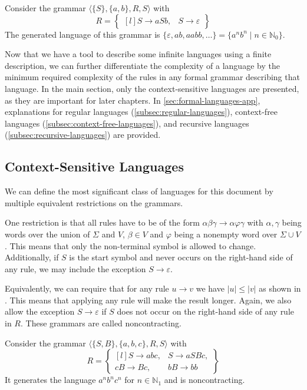 \begin{exmp}
    Consider the grammar $\langle \{S\}, \{a, b\}, R, S \rangle$ with
    \[
        R = \begin{Bmatrix*}[l]
                S \to aSb,
                &S \to \varepsilon
        \end{Bmatrix*}
    \]
    The generated language of this grammar is $\{\varepsilon, ab, aabb, \dots\} = \{a^{n}b^{n} \mid n \in \mathbb{N}_0\}$.
\end{exmp}

Now that we have a tool to describe some infinite languages using a finite description, we can further differentiate the complexity of a language by the minimum required complexity of the rules in any formal grammar describing that language.
In the main section, only the context-sensitive languages are presented, as they are important for later chapters.
In \cref{sec:formal-languages-app}, explanations for regular languages (\cref{subsec:regular-languages}), context-free languages (\cref{subsec:context-free-languages}), and recursive languages (\cref{subsec:recursive-languages}) are provided.

\subsection{Context-Sensitive Languages}\label{subsec:context-sensitive-languages}

We can define the most significant class of languages for this document  by multiple equivalent restrictions on the grammars.

One restriction is that all rules have to be of the form $\alpha\beta\gamma \to \alpha\varphi\gamma$ with $\alpha, \gamma$ being words over the union of $\Sigma$ and $V$, $\beta \in V$ and $\varphi$ being a nonempty word over $\Sigma \cup V$.
This means that only the non-terminal symbol is allowed to change.
Additionally, if $S$ is the start symbol and never occurs on the right-hand side of any rule, we may include the exception $S \to \varepsilon$.

Equivalently, we can require that for any rule $u \to v$ we have $|u| \leq |v|$ as shown in \cite{Parkes2002}.
This means that applying any rule will make the result longer.
Again, we also allow the exception $S \to \varepsilon$ if $S$ does not occur on the right-hand side of any rule in $R$.
These grammars are called noncontracting.

\begin{exmp}
    Consider the grammar $\langle \{S, B\}, \{a, b, c\}, R, S \rangle$ with
    \[
        R = \begin{Bmatrix*}[l]
                S \to abc, &S \to aSBc, \\
                cB \to Bc, &bB \to bb
        \end{Bmatrix*}
    \]
    It generates the language $a^{n}b^{n}c^{n}$ for $n \in \mathbb{N}_{1}$ and is noncontracting.
\end{exmp}

